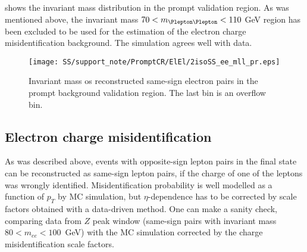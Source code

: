 \begin{table*}[htbp]
\begin{center}
\end{center}
\caption{Ratio between observed and expected same-sign pairs in the $WZ$ and $ZZ$ control region for various cuts on the dielectron invariant mass. 
The uncertainties account for both statistical and systematic errors.}
\label{tab:prompt_ratios}
\end{table*}

 shows the invariant mass distribution in the prompt validation region. As was mentioned above, 
the invariant mass $70 < m_{\Plepton\Plepton}< 110$ GeV region has been excluded
to be used for the estimation of the electron charge misidentification background.
The simulation agrees well with data.

\begin{figure}[h]
\begin{center}
\texttt{[image: SS/support\_note/PromptCR/ElEl/2isoSS\_ee\_mll\_pr.eps]}
\caption{Invariant mass os reconstructed same-sign electron pairs in the prompt background validation region. The last bin is an overflow bin.}
\label{fig:prompt_CR}
\end{center}
\end{figure} 


\subsection{Electron charge misidentification}

As was described above, events with opposite-sign lepton pairs in the final state can be reconstructed as same-sign lepton pairs, 
if the charge of one of the leptons was wrongly identified.
Misidentification probability is well modelled as a function of $p_T$ by MC simulation, 
but $\eta$-dependence has to be corrected by scale factors obtained with a data-driven method.
One can make a sanity check, comparing data from $Z$ peak window (same-sign pairs with invariant mass $80 < m_{ee} < 100$~GeV)
with the MC simulation corrected by the charge misidentification scale factors.

